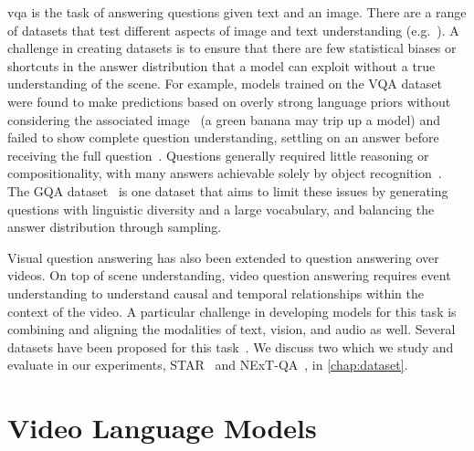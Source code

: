 \Acrfull{vqa} is the task of answering questions given text and an
image. There are a range of datasets that test different aspects of image and
text understanding (e.g.~\citet{johnson2017clevr,hudson2019gqa,antol2015vqa}). A
challenge in creating datasets is to ensure that there are few statistical
biases or shortcuts in the answer distribution that a model can exploit without
a true understanding of the scene. For example, models trained on the VQA
dataset~\citep{antol2015vqa} were found to make predictions based on overly
strong language priors without considering the associated
image~\citep{zhang2016yin} (a green banana may trip up a model) and failed to
show complete question understanding, settling on an answer before receiving
the full question~\citep{agrawal2016analyzing}. Questions generally required
little reasoning or compositionality, with many answers achievable solely by
object recognition~\citep{hudson2019gqa}. The GQA dataset~\citep{hudson2019gqa}
is one dataset that aims to limit these issues by generating questions with
linguistic diversity and a large vocabulary, and balancing the answer
distribution through sampling. 

Visual question answering has also been extended to question answering over
videos. On top of scene understanding, video question answering requires event
understanding to understand causal and temporal relationships within the
context of the video. A particular challenge in developing models for this task
is combining and aligning the modalities of text, vision, and audio as well.
Several datasets have been proposed for this
task~\citep{xu2016msr-vtt,wu2021star,xiao2021nextqa,lei2020tvqaplus}. We
discuss two which we study and evaluate in our experiments,
STAR~\citep{wu2021star} and NExT-QA~\citep{xiao2021nextqa}, in
\cref{chap:dataset}.

\section{Video Language Models}
\label{sec:vidlma}

